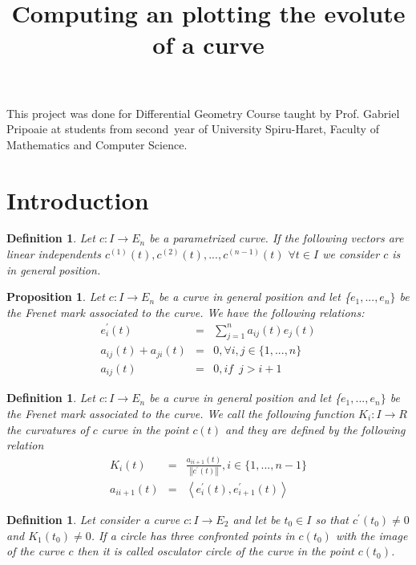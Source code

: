 \documentclass[a4paper]{article}
\newtheorem{definition}[theorem]{Definition}
\newtheorem{proposition}[theorem]{Proposition}
\begin{document}
\date{}
\title{Computing an plotting the evolute of a curve}
\author{}
\maketitle

This project was done for Differential Geometry Course taught by Prof.
Gabriel Pripoaie at students from second\ year of University Spiru-Haret,
Faculty of Mathematics and Computer Science.

\section{Introduction}

\begin{definition}
Let $c:I\rightarrow E_{n}$ be a parametrized curve. If the following vectors
are linear independents $c^{(1)}(t),c^{(2)}(t),...,c^{(n-1)}(t)$ $\forall
t\in I$ we consider $c$ is in general position.
\end{definition}

\begin{proposition}
Let $c:I\rightarrow E_{n}$ be a curve in general position and let \{$%
e_{1},...,e_{n}\}$ be the Frenet mark associated to the curve. We have the
following relations:%
\begin{eqnarray*}
e_{i}^{\prime }(t) &=&\sum_{j=1}^{n}a_{ij}(t)e_{j}(t) \\
a_{ij}(t)+a_{ji}(t) &=&0,\forall i,j\in \{1,...,n\} \\
a_{ij}(t) &=&0,if\,\,\,j>i+1
\end{eqnarray*}
\end{proposition}

\begin{definition}
Let $c:I\rightarrow E_{n}$ be a curve in general position and let \{$%
e_{1},...,e_{n}\}$ be the Frenet mark associated to the curve. We call the
following function $K_{i}:I\rightarrow R$ the curvatures of $c$ curve in the
point $c(t)$ and they are defined by the following relation%
\begin{eqnarray*}
K_{i}(t) &=&\frac{a_{ii+1}(t)}{\left\Vert c^{\prime }(t)\right\Vert },i\in
\{1,...,n-1\} \\
a_{ii+1}(t) &=&\left\langle e_{i}^{\prime }(t),e_{i+1}^{\prime
}(t)\right\rangle 
\end{eqnarray*}
\end{definition}

\begin{definition}
Let consider a curve $c:I\rightarrow E_{2}$ and let be $t_{0}\in I$ so that $%
c^{\prime }(t_{0})\neq 0$ and $K_{1}(t_{0})\neq 0$. If a circle has three
confronted points in $c(t_{0})$ with the image of the curve $c$ then it is
called osculator circle of the curve in the point $c(t_{0})$.
\end{definition}
\end{document}
